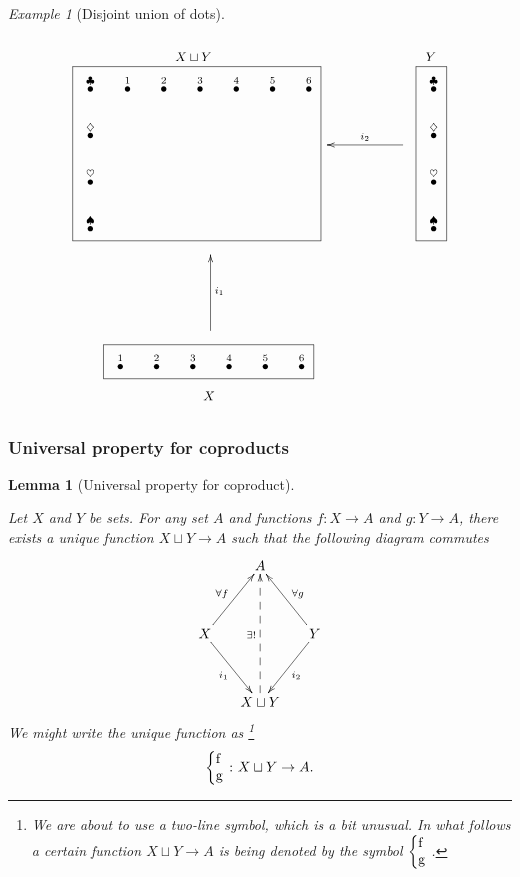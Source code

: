 \documentclass{book}
\def\to{\rightarrow}
\def\taking{\colon}
\newcommand{\LMO}[1]{\stackrel{#1}{\bullet}}
\newcommand{\coprodmap}[2]{{\left\{\parbox{.1in}{#1\\#2}\right.}}
\newtheorem{lemma}[subsubsection]{Lemma}
\theoremstyle{remark}
\newtheorem{example}[subsubsection]{Example}
\theoremstyle{definition}
\begin{document}
\begin{example}[Disjoint union of dots]\label{ex:coprod of dots}

\begin{align}
\parbox{2.4in}{\begin{center}\small $X\sqcup Y$\vspace{-.1in}\end{center}\fbox{
\xymatrix@=15pt{
\LMO{\clubsuit}&\LMO{1}&\LMO{2}&\LMO{3}&\LMO{4}&\LMO{5}&\LMO{6}\\\LMO{\diamondsuit}\\\LMO{\heartsuit}\\\LMO{\spadesuit}
}}}
\parbox{.9in}{
\xymatrix{~&&\ar[ll]_{i_2}~}
}
\parbox{.3in}{\begin{center}\small $Y$\vspace{-.1in}\end{center}\fbox{
\xymatrix@=15pt{
\LMO{\clubsuit}\\\LMO{\diamondsuit}\\\LMO{\heartsuit}\\\LMO{\spadesuit}
}}}
\\\nonumber
\parbox{1in}{\hspace{-1.4in}\xymatrix{~\\\\\ar[uu]_{i_1}}}
\\\nonumber
\parbox{2.1in}{\hspace{-1.3in}\fbox{
\xymatrix@=15pt{
\LMO{1}&\LMO{2}&\LMO{3}&\LMO{4}&\LMO{5}&\LMO{6}
}}\begin{center}\hspace{-2.6in}\small$X$\end{center}}
\end{align}

\end{example}


\subsubsection{Universal property for coproducts}

\begin{lemma}[Universal property for coproduct]\label{lemma:up for coprod}

Let $X$ and $Y$ be sets. For any set $A$ and functions $f\taking X\to A$ and $g\taking Y\to A$, there exists a unique function $X\sqcup Y\to A$ such that the following diagram commutes
$$
\xymatrix@=15pt{&A\\\\X\ar[uur]^{\forall f}\ar[ddr]_{i_1}&&Y\ar[uul]_{\forall g}\ar[ddl]^{i_2}\\\\&X\sqcup Y\ar@{-->}[uuuu]^{\exists!}}
$$
We might write the unique function as 
\footnote{We are about to use a two-line symbol, which is a bit unusual. In what follows a certain function $X\sqcup Y\to A$ is being denoted by the symbol $\coprodmap{f}{g}$.}
$$\coprodmap{f}{g}\taking X\sqcup Y\to A.$$

\end{lemma}
\end{document}
